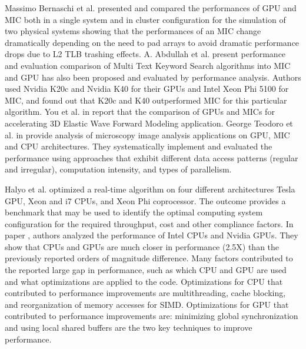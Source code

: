 
Massimo Bernaschi et al. \cite{R:10} presented and compared the performances of GPU and MIC both in a single system and in cluster configuration for the simulation of two physical systems showing that the performances of an MIC change dramatically depending on the need to pad arrays to avoid dramatic performance drops due to L2 TLB trashing effects.  
A. Abdullah et al. \cite{R:12} present performance and evaluation comparison of Multi Text Keyword Search algorithms into MIC and GPU has also been proposed and evaluated by performance analysis. Authors used Nvidia K20c and Nvidia K40 for their GPUs and Intel Xeon Phi 5100 for MIC, and found out that K20c and K40 outperformed MIC for this particular algorithm. 
You et al. in \cite{R:8} report that the comparison of GPUs and MICs for accelerating 3D Elastic Wave Forward
Modeling application. 
George Teodoro et al. in \cite{R:9} provide analysis of microscopy image analysis applications on GPU, MIC and CPU architectures. 
They systematically implement and evaluated the performance using approaches that exhibit different data access patterns (regular and irregular), computation intensity, and types of parallelism. %



Halyo et al. \cite{halyo2014first} optimized a real-time algorithm on four different architectures Tesla GPU, Xeon and i7 CPUs, and Xeon Phi coprocessor. The outcome provides a benchmark that may be used to identify the optimal computing system configuration for the required throughput, cost and other compliance factors.
In paper \cite{lee2010debunking}, authors analyzed the performance of Intel CPUs and Nvidia GPUs. They show that CPUs and GPUs are much closer in performance (2.5X) than the previously reported orders of magnitude difference. Many factors contributed to the reported large gap in performance, such as which CPU and GPU are used and what optimizations are applied to the code. Optimizations for CPU that contributed to performance improvements are multithreading, cache blocking, and reorganization of memory accesses for SIMD. Optimizations for GPU that contributed to performance improvements are: minimizing global synchronization and using local shared buffers are the two key techniques to improve performance.  




